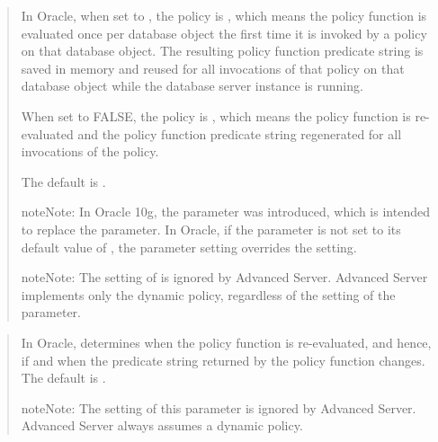 \documentclass[letterpaper,10pt,english,openany,oneside]{sphinxmanual}
\begin{document}
\begin{quote}

In Oracle, when set to , the policy is , which means the
policy function is evaluated once per database object the first time it
is invoked by a policy on that database object. The resulting policy
function predicate string is saved in memory and reused for all
invocations of that policy on that database object while the database
server instance is running.

When set to FALSE, the policy is , which means the policy
function is re-evaluated and the policy function predicate string
regenerated for all invocations of the policy.

The default is .

\begin{sphinxadmonition}{note}{Note:}
In Oracle 10g, the  parameter was introduced, which is intended to replace the  parameter. In Oracle, if the  parameter is not set to its default value of , the  parameter setting overrides the  setting.
\end{sphinxadmonition}

\begin{sphinxadmonition}{note}{Note:}
The setting of  is ignored by Advanced Server. Advanced Server implements only the dynamic policy, regardless of the setting of the  parameter.
\end{sphinxadmonition}
\end{quote}

\newpage

\begin{quote}

In Oracle, determines when the policy function is re-evaluated, and
hence, if and when the predicate string returned by the policy function
changes. The default is .

\begin{sphinxadmonition}{note}{Note:}
The setting of this parameter is ignored by Advanced Server. Advanced Server always assumes a dynamic policy.
\end{sphinxadmonition}
\end{quote}
\end{document}
